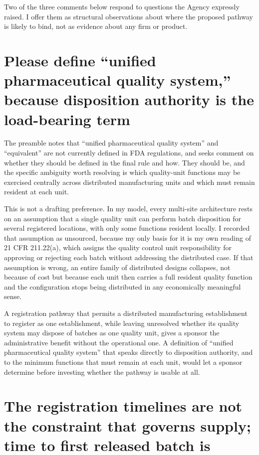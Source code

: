\documentclass[11pt,letterpaper]{article}
\begin{document}
Two of the three comments below respond to questions the Agency expressly raised. I offer them as
structural observations about where the proposed pathway is likely to bind, not as evidence about
any firm or product.

\section{Please define ``unified pharmaceutical quality system,'' because disposition authority is
the load-bearing term}

The preamble notes that ``unified pharmaceutical quality system'' and ``equivalent'' are not
currently defined in FDA regulations, and seeks comment on whether they should be defined in the
final rule and how. They should be, and the specific ambiguity worth resolving is which quality-unit
functions may be exercised centrally across distributed manufacturing units and which must remain
resident at each unit.

This is not a drafting preference. In my model, every multi-site architecture rests on an assumption
that a single quality unit can perform batch disposition for several registered locations, with only
some functions resident locally. I recorded that assumption as unsourced, because my only basis for
it is my own reading of 21 CFR 211.22(a), which assigns the quality control unit responsibility for
approving or rejecting each batch without addressing the distributed case. If that assumption is
wrong, an entire family of distributed designs collapses, not because of cost but because each unit
then carries a full resident quality function and the configuration stops being distributed in any
economically meaningful sense.

A registration pathway that permits a distributed manufacturing establishment to register as one
establishment, while leaving unresolved whether its quality system may dispose of batches as one
quality unit, gives a sponsor the administrative benefit without the operational one. A definition
of ``unified pharmaceutical quality system'' that speaks directly to disposition authority, and to
the minimum functions that must remain at each unit, would let a sponsor determine before investing
whether the pathway is usable at all.

\section{The registration timelines are not the constraint that governs supply; time to first
released batch is}
\end{document}
